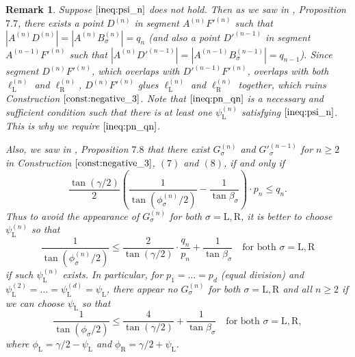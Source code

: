 \documentclass[11pt]{amsart}
\newtheorem{remark}[theorem]{Remark}
\numberwithin{equation}{section}
\numberwithin{theorem}{section}
\newcommand{\Lt}{\ensuremath{\mathrm{L}}}
\newcommand{\Rt}{\ensuremath{\mathrm{R}}}
\newcommand{\norm}[1]{\ensuremath{\left| #1 \right|}}
\begin{document}
\begin{remark}\label{rem:meaning_ineq_qn}\rm
Suppose $\eqref{ineq:psi_n}$ does not hold.
Then as we saw in \cite{Doi20}, Proposition $7.7$,
there exists a point $D^{(n)}$ in segment $A^{(n)}{F'}^{(n)}$ such that $\norm{A^{(n)}D^{(n)}}=\norm{A^{(n)}B_\sigma^{(n)}}=q_n$
(and also a point ${D'}^{(n-1)}$ in segment $A^{(n-1)}{F'}^{(n)}$ such that $\norm{A^{(n)}{D'}^{(n-1)}}=\norm{A^{(n-1)}B_\sigma^{(n-1)}}=q_{n-1}$).
Since segment $D^{(n)}{F'}^{(n)}$, which overlaps with ${D'}^{(n-1)}{F'}^{(n)}$, overlaps with both $\ell_\Lt^{(n)}$ and $\ell_\Rt^{(n)}$,
$D^{(n)}{F'}^{(n)}$ glues $\ell_\Lt^{(n)}$ and $\ell_\Rt^{(n)}$ together, which ruins Construction $\ref{const:negative_3}$.
Note that $\eqref{ineq:pn_qn}$ is a necessary and sufficient condition such that there is at least one $\psi_\Lt^{(n)}$ satisfying $\eqref{ineq:psi_n}$.
This is why we require $\eqref{ineq:pn_qn}$.

Also, we saw in \cite{Doi20}, Proposition $7.8$ that there exist $G_\sigma^{(n)}$ and ${G'}_\sigma^{(n-1)}$ for $n\geqslant 2$
in Construction $\ref{const:negative_3}$, $(7)$ and $(8)$, if and only if
\begin{equation*}
\frac{\tan (\gamma /2)}{2}\left(\frac{1}{\tan (\phi_\sigma^{(n)}/2)}-\frac{1}{\tan\beta_\sigma}\right)\cdot p_n\leqslant q_n.
\end{equation*}
Thus to avoid the appearance of $G_\sigma^{(n)}$ for both $\sigma =\Lt ,\Rt$, it is better to choose $\psi_\Lt^{(n)}$ so that
\begin{equation*}
\frac{1}{\tan (\phi_\sigma^{(n)}/2)}\leqslant\frac{2}{\tan (\gamma /2)}\cdot\frac{q_n}{p_n}+\frac{1}{\tan\beta_\sigma}\quad\text{for both }\sigma =\Lt ,\Rt
\end{equation*}
if such $\psi_\Lt^{(n)}$ exists.
In particular, for $p_1=\dots =p_d$ (equal division) and $\psi_\Lt^{(2)}=\dots =\psi_\Lt^{(d)}=\psi_\Lt$, 
there appear no $G_\sigma^{(n)}$ for both $\sigma =\Lt ,\Rt$ and all $n\geqslant 2$ if we can choose $\psi_\Lt$ so that
\begin{equation*}
\frac{1}{\tan (\phi_\sigma /2)}\leqslant\frac{4}{\tan (\gamma /2)}+\frac{1}{\tan\beta_\sigma}\quad\text{for both }\sigma =\Lt ,\Rt ,
\end{equation*}
where $\phi_\Lt =\gamma /2-\psi_\Lt$ and $\phi_\Rt =\gamma /2+\psi_\Lt$.
\end{remark}
\end{document}

